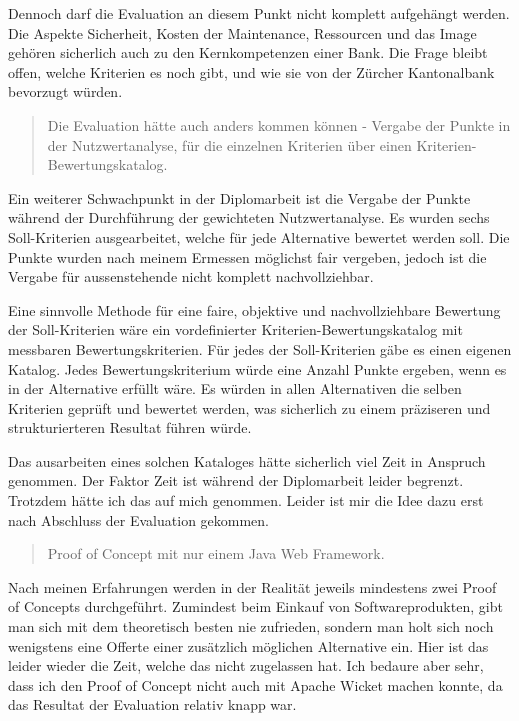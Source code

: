 Dennoch darf die Evaluation an diesem Punkt nicht komplett aufgehängt werden.
Die Aspekte Sicherheit, Kosten der Maintenance, Ressourcen und das Image gehören
sicherlich auch zu den Kernkompetenzen einer Bank. Die Frage bleibt offen,
welche Kriterien es noch gibt, und wie sie von der Zürcher Kantonalbank
bevorzugt würden.
\newline
  
\begin{quote}\begin{itshape}Die Evaluation hätte auch anders kommen können -
Vergabe der Punkte in der Nutzwertanalyse, für die einzelnen Kriterien über
einen Kriterien-Bewertungskatalog.\end{itshape}\end{quote}

Ein weiterer Schwachpunkt in der Diplomarbeit ist die Vergabe der Punkte während
der Durchführung der gewichteten Nutzwertanalyse. Es wurden sechs Soll-Kriterien
ausgearbeitet, welche für jede Alternative bewertet werden soll. Die Punkte
wurden nach meinem Ermessen möglichst fair vergeben, jedoch ist die Vergabe für
aussenstehende nicht komplett nachvollziehbar.

Eine sinnvolle Methode für eine faire, objektive und nachvollziehbare Bewertung
der Soll-Kriterien wäre ein vordefinierter Kriterien-Bewertungskatalog mit
messbaren Bewertungskriterien. Für jedes der Soll-Kriterien gäbe es einen
eigenen Katalog. Jedes Bewertungskriterium würde eine Anzahl Punkte ergeben,
wenn es in der Alternative erfüllt wäre. Es würden in allen Alternativen die
selben Kriterien geprüft und bewertet werden, was sicherlich zu einem
präziseren und strukturierteren Resultat führen würde.

Das ausarbeiten eines solchen Kataloges hätte sicherlich viel Zeit in Anspruch
genommen. Der Faktor Zeit ist während der Diplomarbeit leider begrenzt. Trotzdem
hätte ich das auf mich genommen. Leider ist mir die Idee dazu erst nach
Abschluss der Evaluation gekommen.
\newline
  
\begin{quote}\begin{itshape}Proof of Concept mit nur einem Java Web
Framework.\end{itshape}\end{quote}

Nach meinen Erfahrungen werden in der Realität jeweils mindestens zwei Proof of
Concepts durchgeführt. Zumindest beim Einkauf von Softwareprodukten, gibt man
sich mit dem theoretisch besten nie zufrieden, sondern man holt sich noch
wenigstens eine Offerte einer zusätzlich möglichen Alternative ein. Hier ist das
leider wieder die Zeit, welche das nicht zugelassen hat. Ich bedaure aber sehr,
dass ich den Proof of Concept nicht auch mit Apache Wicket machen konnte, da das
Resultat der Evaluation relativ knapp war.
\newline

